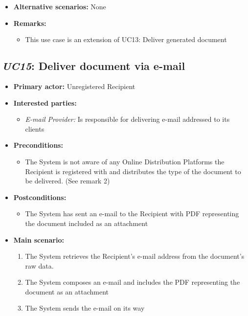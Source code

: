 \documentclass[a4paper,10pt]{article}
\begin{document}
\begin{itemize}
    \item \textbf{Alternative scenarios:} 
    None
    
    \item \textbf{Remarks:}
        \begin{itemize}
            \item This use case is an extension of UC13: Deliver generated document
        \end{itemize}
\end{itemize}

\subsection{\emph{UC15}: Deliver document via e-mail}
\begin{itemize}
    \item \textbf{Primary actor:} Unregistered Recipient
    \item \textbf{Interested parties:} 
        \begin{itemize}
            \item \textit{E-mail Provider:} Is responsible for delivering e-mail addressed to its clients
        \end{itemize}

    \item \textbf{Preconditions:}
        \begin{itemize}
            \item The System is not aware of any Online Distribution Platforms the Recipient is registered with and distributes the type of the document to be delivered. (See remark 2)
        \end{itemize}

    \item \textbf{Postconditions:}
        \begin{itemize}
            \item The System has sent an e-mail to the Recipient with PDF representing the document included as an attachment
        \end{itemize}
        
    \item \textbf{Main scenario:} 
    \begin{enumerate}
       \item The System retrieves the Recipient's e-mail address from the document's raw data.
       \item The System composes an e-mail and includes the PDF representing the document as an attachment
       \item The System sends the e-mail on its way
    \end{enumerate}


\end{itemize}
\end{document}

